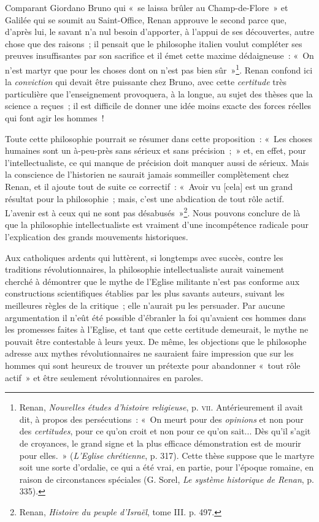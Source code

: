 \documentclass[french,twoside]{book} %
\begin{document}
Comparant Giordano Bruno qui « se laissa brûler au Champ-de-Flore » et Galilée qui se soumit au Saint-Office, Renan approuve le second parce que, d’après lui, le savant n’a nul besoin d’apporter, à l’appui de ses découvertes, autre chose que des raisons ; il pensait que le philosophe italien voulut compléter ses preuves insuffisantes par son sacrifice et il émet cette maxime dédaigneuse : « On n’est martyr que pour les choses dont on n’est pas bien sûr »\footnote{ \noindent Renan, \emph{Nouvelles études d’histoire religieuse}, p. {\scshape vii}. Antérieurement il avait dit, à propos des persécutions : « On meurt pour des \emph{opinions} et non pour des \emph{certitudes}, pour ce qu’on croit et non pour ce qu’on sait... Dès qu’il s’agit de croyances, le grand signe et la plus efficace démonstration est de mourir pour elles. » (\emph{L’Eglise chrétienne}, p. 317). Cette thèse suppose que le martyre soit une sorte d’ordalie, ce qui a été vrai, en partie, pour l’époque romaine, en raison de circonstances spéciales (G. Sorel, \emph{Le système historique de Renan}, p. 335).
 }. Renan confond ici la \emph{conviction} qui devait être puissante chez Bruno, avec cette \emph{certitude} très particulière que l’enseignement provoquera, à la longue, au sujet des thèses que la science a reçues ; il est difficile  de donner une idée moins exacte des forces réelles qui font agir les hommes !\par
Toute cette philosophie pourrait se résumer dans cette proposition : « Les choses humaines sont un à-peu-près sans sérieux et sans précision ; » et, en effet, pour l’intellectualiste, ce qui manque de précision doit manquer aussi de sérieux. Mais la conscience de l’historien ne saurait jamais sommeiller complètement chez Renan, et il ajoute tout de suite ce correctif : « Avoir vu [cela] est un grand résultat pour la philosophie ; mais, c’est une abdication de tout rôle actif. L’avenir est à ceux qui ne sont pas désabusés »\footnote{ \noindent Renan, \emph{Histoire du peuple d’Israël}, tome III. p. 497.
 }. Nous pouvons conclure de là que la philosophie intellectualiste est vraiment d’une incompétence radicale pour l’explication des grands mouvements historiques.\par
Aux catholiques ardents qui luttèrent, si longtemps avec succès, contre les traditions révolutionnaires, la philosophie intellectualiste aurait vainement cherché à démontrer que le mythe de l’Eglise militante n’est pas conforme aux constructions scientifiques établies par les plus savants auteurs, suivant les meilleures règles de la critique ; elle n’aurait pu les persuader. Par aucune argumentation il n’eût été possible d’ébranler la foi qu’avaient ces hommes dans les promesses faites à l’Eglise, et tant que cette certitude demeurait, le mythe ne pouvait être contestable à leurs yeux. De même, les objections que le philosophe adresse aux mythes révolutionnaires ne sauraient faire impression que sur les hommes qui sont heureux de trouver un prétexte pour abandonner « tout  rôle actif » et être seulement révolutionnaires en paroles.\par
\end{document}
